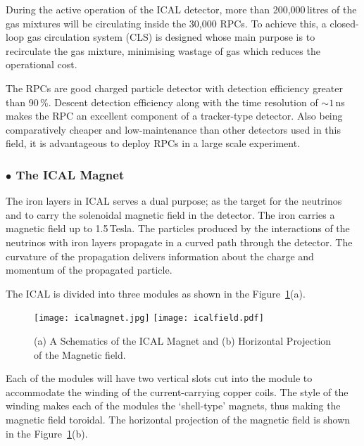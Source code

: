 During the active operation of the ICAL detector, more than
200,000\,litres of the gas mixtures will be circulating inside the
30,000 RPCs. To achieve this, a closed-loop gas circulation system
(CLS) is designed whose main purpose is to recirculate the gas
mixture, minimising wastage of gas which reduces the operational cost.

The RPCs are good charged particle detector with detection efficiency
greater than 90\,\%. Descent detection efficiency along with the time
resolution of $\sim 1$\,ns makes the RPC an excellent component of a
tracker-type detector. Also being comparatively cheaper and
low-maintenance than other detectors used in this field, it is
advantageous to deploy RPCs in a large scale experiment.

\subsubsection*{$\bullet$ The ICAL Magnet}
The iron layers in ICAL serves a dual purpose; as the target for the
neutrinos and to carry the solenoidal magnetic field in the
detector\cite{icalmagnet}. The iron carries a magnetic field up to
1.5\,Tesla. The particles produced by the interactions of the
neutrinos with iron layers propagate in a curved path through the
detector. The curvature of the propagation delivers information about
the charge and momentum of the propagated particle.

The ICAL is divided into three modules as shown in the
Figure~\ref{fig:magnet}(a). 
\begin{figure}[h]
  \centering
  \texttt{[image: icalmagnet.jpg]}
  \texttt{[image: icalfield.pdf]}
  \caption{(a) A Schematics of the ICAL Magnet and (b) Horizontal Projection of the Magnetic field\cite{icalmagnet}.}
  \label{fig:magnet}
\end{figure}
Each of the modules will have two vertical slots cut into the module
to accommodate the winding of the current-carrying copper coils. The
style of the winding makes each of the modules the
`shell-type'\cite{transformer} magnets, thus making the magnetic field
toroidal. The horizontal projection of the magnetic field is shown in
the Figure~\ref{fig:magnet}(b).

